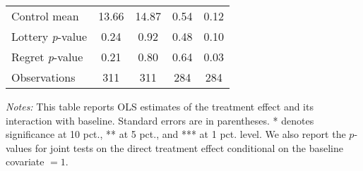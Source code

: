 \begin{table}[ht]
{\begin{threeparttable}
\begin{tabular}{l*{4}{c}}
Control mean    &    13.66         &    14.87         &     0.54         &     0.12         \\
Lottery \emph{p}-value&     0.24         &     0.92         &     0.48         &     0.10         \\
Regret \emph{p}-value&     0.21         &     0.80         &     0.64         &     0.03         \\
Observations    &      311         &      311         &      284         &      284         \\
\bottomrule \end{tabular} \begin{tablenotes}[flushleft] \footnotesize \item \emph{Notes:} This table reports OLS estimates of the treatment effect and its interaction with baseline. Standard errors are in parentheses. * denotes significance at 10 pct., ** at 5 pct., and *** at 1 pct. level. We also report the \(p\)-values for joint tests on the direct treatment effect conditional on the baseline covariate $= 1$. \end{tablenotes} \end{threeparttable} } \end{table}

